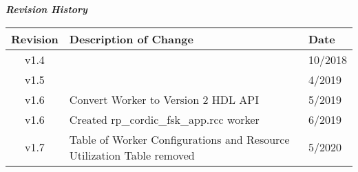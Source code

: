\iffalse
This file is protected by Copyright. Please refer to the COPYRIGHT file
distributed with this source distribution.

This file is part of OpenCPI <http://www.opencpi.org>

OpenCPI is free software: you can redistribute it and/or modify it under the
terms of the GNU Lesser General Public License as published by the Free Software
Foundation, either version 3 of the License, or (at your option) any later
version.

OpenCPI is distributed in the hope that it will be useful, but WITHOUT ANY
WARRANTY; without even the implied warranty of MERCHANTABILITY or FITNESS FOR A
PARTICULAR PURPOSE. See the GNU Lesser General Public License for more details.

You should have received a copy of the GNU Lesser General Public License along
with this program. If not, see <http://www.gnu.org/licenses/>.
\fi

\def\comp{rp\_{}cordic}
\def\rcc_comp{rp\_{}cordic\_{}for\_{}fskapp}
\edef\ecomp{rp_cordic}
\def\Comp{Rectangular to Polar CORDIC}
\def\docTitle{\Comp{} Component Data Sheet}
\def\snippetpath{../../../../../../doc/av/tex/snippets}

\graphicspath{{figures/}}


\maketitle
\thispagestyle{empty}
\newpage

\begin{center}
	\textit{\textbf{Revision History}}
	\begin{table}[H]
	\label{table:revisions} %
		\begin{tabularx}{\textwidth}{|c|X|l|}
		\hline
		\rowcolor{blue}
		\textbf{Revision} & \textbf{Description of Change} & \textbf{Date} \\
		\hline
		v1.4 & & 10/2018 \\
		\hline
		v1.5 & & 4/2019 \\
		\hline
		v1.6 & Convert Worker to Version 2 HDL API & 5/2019 \\
		\hline
		v1.6 & Created rp\_cordic\_fsk\_app.rcc worker &  6/2019 \\
		\hline
		v1.7 & Table of Worker Configurations and Resource Utilization Table removed & 5/2020 \\
			\hline
		\end{tabularx}
	\end{table}
\end{center}
\newpage

